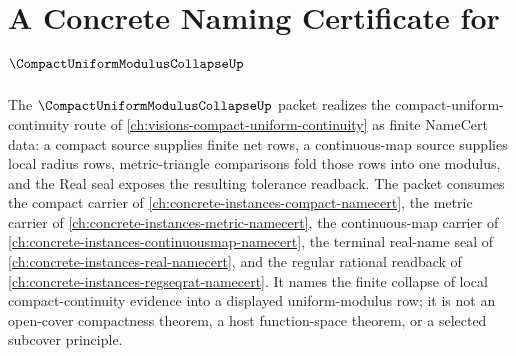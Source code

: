 \chapter{A Concrete Naming Certificate for $\CompactUniformModulusCollapseUp$}
\label{ch:concrete-instances-compact-uniform-modulus-collapse-namecert}

The $\CompactUniformModulusCollapseUp$ packet realizes the compact-uniform-continuity route of \autoref{ch:visions-compact-uniform-continuity} as finite NameCert data: a compact source supplies finite net rows, a continuous-map source supplies local radius rows, metric-triangle comparisons fold those rows into one modulus, and the Real seal exposes the resulting tolerance readback. The packet consumes the compact carrier of \autoref{ch:concrete-instances-compact-namecert}, the metric carrier of \autoref{ch:concrete-instances-metric-namecert}, the continuous-map carrier of \autoref{ch:concrete-instances-continuousmap-namecert}, the terminal real-name seal of \autoref{ch:concrete-instances-real-namecert}, and the regular rational readback of \autoref{ch:concrete-instances-regseqrat-namecert}. It names the finite collapse of local compact-continuity evidence into a displayed uniform-modulus row; it is not an open-cover compactness theorem, a host function-space theorem, or a selected subcover principle.

